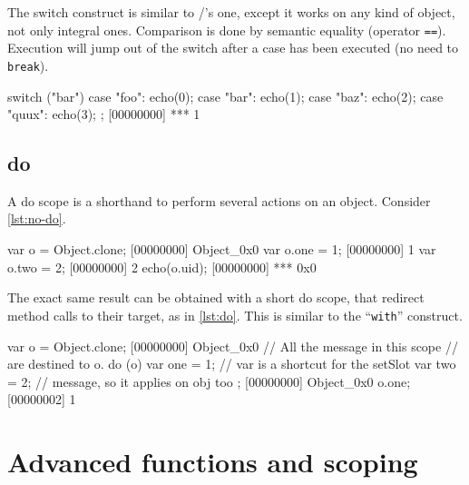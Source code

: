 The switch construct is similar to \C/\Cxx's one, except it works on
any kind of object, not only integral ones. Comparison is done by
semantic equality (operator \texttt{==}). Execution will jump out of
the switch after a case has been executed (no need to \texttt{break}).

\begin{urbiscript}[caption=The \texttt{switch} construct,
label=switch]
switch ("bar")
{
  case "foo":
    echo(0);
  case "bar":
    echo(1);
  case "baz":
    echo(2);
  case "quux":
    echo(3);
};
[00000000] *** 1
\end{urbiscript}

\section{do}
\label{section:constructs/do}

A do scope is a shorthand to perform several actions on an
object. Consider \autoref{lst:no-do}.

\begin{urbiscript}[caption=Lot of code bloat,label=lst:no-do]
var o = Object.clone;
[00000000] Object_0x0
var o.one = 1;
[00000000] 1
var o.two = 2;
[00000000] 2
echo(o.uid);
[00000000] *** 0x0
\end{urbiscript}

The exact same result can be obtained with a short do scope, that
redirect method calls to their target, as in \autoref{lst:do}. This is similar
to the \pascal ``\texttt{with}'' construct.


\begin{urbiscript}[caption=Shorter with a do block,label=lst:do]
var o = Object.clone;
[00000000] Object_0x0
// All the message in this scope
// are destined to o.
do (o)
{
 var one = 1; // var is a shortcut for the setSlot
 var two = 2; // message, so it applies on obj too
};
[00000000] Object_0x0
o.one;
[00000002] 1
\end{urbiscript}



\chapter{Advanced functions and scoping}


